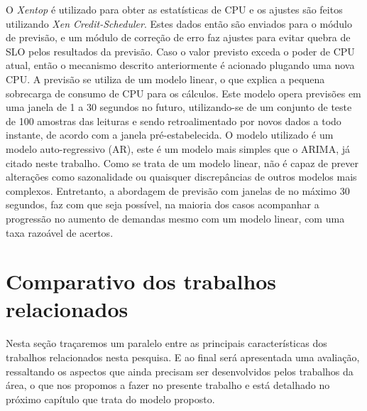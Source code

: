 \documentclass[twoside,english,brazilian]{UNISINOSmonografia}
\begin{document}
O \textit{Xentop} é utilizado para obter as estatísticas de CPU e os ajustes são feitos utilizando \textit{Xen Credit-Scheduler}. Estes dados então são enviados para o módulo de previsão, e um módulo de correção de erro faz ajustes para evitar quebra de SLO pelos resultados da previsão. Caso o valor previsto exceda o poder de CPU atual, então o mecanismo descrito anteriormente é acionado plugando uma nova CPU. A previsão se utiliza de um modelo linear, o que explica a pequena sobrecarga de consumo de CPU para os cálculos. Este modelo opera previsões em uma janela de 1 a 30 segundos no futuro, utilizando-se de um conjunto de teste de 100 amostras das leituras e sendo retroalimentado por novos dados a todo instante, de acordo com a janela pré-estabelecida. O modelo utilizado é um modelo auto-regressivo (AR), este é um modelo mais simples que o ARIMA, já citado neste trabalho. Como se trata de um modelo linear, não é capaz de prever alterações como sazonalidade ou quaisquer discrepâncias de outros modelos mais complexos. Entretanto, a abordagem de previsão com janelas de no máximo 30 segundos, faz com que seja possível, na maioria dos casos acompanhar a progressão no aumento de demandas mesmo com um modelo linear, com uma taxa razoável de acertos.


\section{Comparativo dos trabalhos relacionados}
Nesta seção traçaremos um paralelo entre as principais características dos trabalhos relacionados nesta pesquisa. E ao final será apresentada uma avaliação, ressaltando os aspectos que ainda precisam ser desenvolvidos pelos trabalhos da área, o que nos propomos a fazer no presente trabalho e está detalhado no próximo capítulo que trata do modelo proposto.
\end{document}

